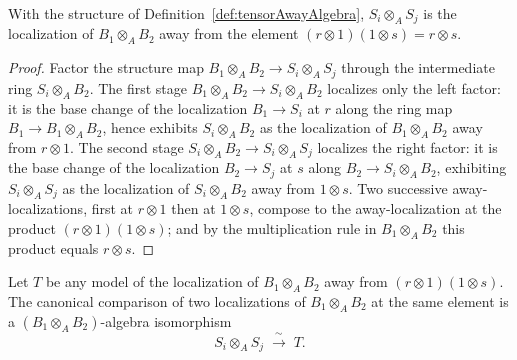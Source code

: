 \begin{theorem}
  \label{thm:isLocalization_away_tensor}
  \leanok
  With the structure of Definition~\ref{def:tensorAwayAlgebra}, \(S_i \otimes_A S_j\) is the
  localization of \(B_1 \otimes_A B_2\) away from the element
  \((r \otimes 1)(1 \otimes s) = r \otimes s\).
\end{theorem}
\begin{proof}
  \leanok
  Factor the structure map \(B_1 \otimes_A B_2 \to S_i \otimes_A S_j\) through the intermediate
  ring \(S_i \otimes_A B_2\). The first stage \(B_1 \otimes_A B_2 \to S_i \otimes_A B_2\)
  localizes only the left factor: it is the base change of the localization \(B_1 \to S_i\) at
  \(r\) along the ring map \(B_1 \to B_1 \otimes_A B_2\), hence exhibits \(S_i \otimes_A B_2\) as
  the localization of \(B_1 \otimes_A B_2\) away from \(r \otimes 1\). The second stage
  \(S_i \otimes_A B_2 \to S_i \otimes_A S_j\) localizes the right factor: it is the base change of
  the localization \(B_2 \to S_j\) at \(s\) along \(B_2 \to S_i \otimes_A B_2\), exhibiting
  \(S_i \otimes_A S_j\) as the localization of \(S_i \otimes_A B_2\) away from \(1 \otimes s\).
  Two successive away-localizations, first at \(r \otimes 1\) then at \(1 \otimes s\), compose
  to the away-localization at the product \((r \otimes 1)(1 \otimes s)\); and by the
  multiplication rule in \(B_1 \otimes_A B_2\) this product equals \(r \otimes s\).
\end{proof}

\begin{definition}
  \label{def:tensorAwayEquiv}
  \leanok
  Let \(T\) be any model of the localization of \(B_1 \otimes_A B_2\) away from
  \((r \otimes 1)(1 \otimes s)\). The canonical comparison of two localizations of
  \(B_1 \otimes_A B_2\) at the same element is a \((B_1 \otimes_A B_2)\)-algebra isomorphism
  \[
    S_i \otimes_A S_j \;\xrightarrow{\ \sim\ }\; T .
  \]
\end{definition}

